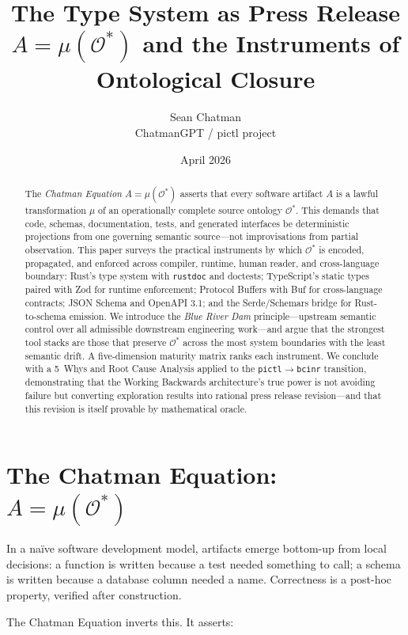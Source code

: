 \documentclass[11pt,a4paper]{article}
\title{\textbf{The Type System as Press Release}\\[6pt]
\large $A = \mu(\mathcal{O}^*)$ and the Instruments of Ontological Closure}
\author{Sean Chatman\\
\small ChatmanGPT / pictl project}
\date{April 2026}
\theoremstyle{definition}
\begin{document}
\maketitle

\begin{abstract}
The \textit{Chatman Equation} $A = \mu(\mathcal{O}^*)$ asserts that every software artifact $A$ is a lawful transformation $\mu$ of an operationally complete source ontology $\mathcal{O}^*$. This demands that code, schemas, documentation, tests, and generated interfaces be deterministic projections from one governing semantic source---not improvisations from partial observation. This paper surveys the practical instruments by which $\mathcal{O}^*$ is encoded, propagated, and enforced across compiler, runtime, human reader, and cross-language boundary: Rust's type system with \texttt{rustdoc} and doctests; TypeScript's static types paired with Zod for runtime enforcement; Protocol Buffers with Buf for cross-language contracts; JSON Schema and OpenAPI 3.1; and the Serde/Schemars bridge for Rust-to-schema emission. We introduce the \textit{Blue River Dam} principle---upstream semantic control over all admissible downstream engineering work---and argue that the strongest tool stacks are those that preserve $\mathcal{O}^*$ across the most system boundaries with the least semantic drift. A five-dimension maturity matrix ranks each instrument. We conclude with a 5~Whys and Root Cause Analysis applied to the \texttt{pictl}$\to$\texttt{bcinr} transition, demonstrating that the Working Backwards architecture's true power is not avoiding failure but converting exploration results into rational press release revision---and that this revision is itself provable by mathematical oracle.
\end{abstract}

\tableofcontents
\newpage

\section{The Chatman Equation: $A = \mu(\mathcal{O}^*)$}

In a naïve software development model, artifacts emerge bottom-up from local decisions: a function is written because a test needed something to call; a schema is written because a database column needed a name. Correctness is a post-hoc property, verified after construction.

The Chatman Equation inverts this. It asserts:
\end{document}
